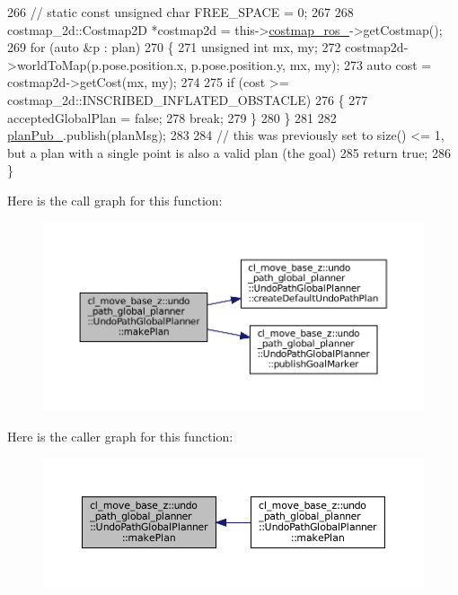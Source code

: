 \begin{DoxyCode}
266             \textcolor{comment}{// static const unsigned char FREE\_SPACE = 0;}
267 
268             costmap\_2d::Costmap2D *costmap2d = this->\hyperlink{classcl__move__base__z_1_1undo__path__global__planner_1_1UndoPathGlobalPlanner_ab63eeb465e3ae989a6edcc4d059cf8f0}{costmap\_ros\_}->getCostmap();
269             \textcolor{keywordflow}{for} (\textcolor{keyword}{auto} &p : plan)
270             \{
271                 \textcolor{keywordtype}{unsigned} \textcolor{keywordtype}{int} mx, my;
272                 costmap2d->worldToMap(p.pose.position.x, p.pose.position.y, mx, my);
273                 \textcolor{keyword}{auto} cost = costmap2d->getCost(mx, my);
274 
275                 \textcolor{keywordflow}{if} (cost >= costmap\_2d::INSCRIBED\_INFLATED\_OBSTACLE)
276                 \{
277                     acceptedGlobalPlan = \textcolor{keyword}{false};
278                     \textcolor{keywordflow}{break};
279                 \}
280             \}
281 
282             \hyperlink{classcl__move__base__z_1_1undo__path__global__planner_1_1UndoPathGlobalPlanner_a65bf364a122d5950baf1bf8b42309d68}{planPub\_}.publish(planMsg);
283 
284             \textcolor{comment}{// this was previously set to size() <= 1, but a plan with a single point is also a valid plan
       (the goal)}
285             \textcolor{keywordflow}{return} \textcolor{keyword}{true};
286         \}
\end{DoxyCode}
Here is the call graph for this function\+:
\nopagebreak
\begin{figure}[H]
\begin{center}
\leavevmode
\includegraphics[width=350pt]{classcl__move__base__z_1_1undo__path__global__planner_1_1UndoPathGlobalPlanner_a46034d27c0811abae440009457a7f8b0_cgraph}
\end{center}
\end{figure}
Here is the caller graph for this function\+:
\nopagebreak
\begin{figure}[H]
\begin{center}
\leavevmode
\includegraphics[width=350pt]{classcl__move__base__z_1_1undo__path__global__planner_1_1UndoPathGlobalPlanner_a46034d27c0811abae440009457a7f8b0_icgraph}
\end{center}
\end{figure}
